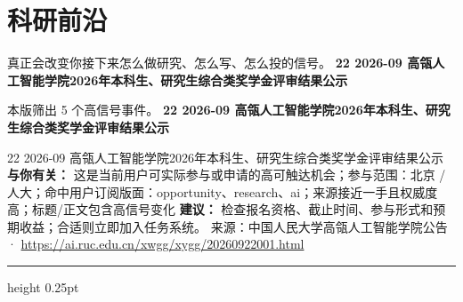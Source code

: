 \documentclass[10.5pt]{ctexart}
\begin{document}
\section*{科研前沿}
{\color{ormuted} 真正会改变你接下来怎么做研究、怎么写、怎么投的信号。}
\vspace{2mm}
{\LARGE\bfseries 22 2026-09 高瓴人工智能学院2026年本科生、研究生综合类奖学金评审结果公示}\par
\vspace{1mm}
{\color{ormuted} 本版筛出 5 个高信号事件。}
\vspace{3mm}
{\Large\bfseries 22 2026-09 高瓴人工智能学院2026年本科生、研究生综合类奖学金评审结果公示}\par
22 2026-09 高瓴人工智能学院2026年本科生、研究生综合类奖学金评审结果公示
\textbf{与你有关：} 这是当前用户可实际参与或申请的高可触达机会；参与范围：北京 / 人大；命中用户订阅版面：opportunity、research、ai；来源接近一手且权威度高；标题/正文包含高信号变化
\textbf{建议：} 检查报名资格、截止时间、参与形式和预期收益；合适则立即加入任务系统。
{\footnotesize\color{ormuted} 来源：中国人民大学高瓴人工智能学院公告 · \url{https://ai.ruc.edu.cn/xwgg/xygg/20260922001.html}}
\vspace{4mm}
\hrule height 0.25pt
\vspace{3mm}
\end{document}
